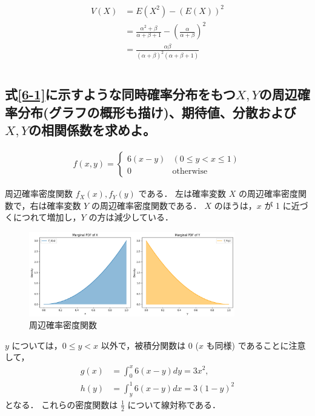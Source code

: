 \documentclass[titlepage,a4paper]{jsarticle}
\begin{document}
\begin{align}
  V(X) & = E(X^2) - (E(X))^2                                                                            \\
       & = \frac{\alpha^2 + \beta}{\alpha + \beta + 1} - \left( \frac{\alpha}{\alpha + \beta} \right)^2 \\
       & = \frac{\alpha \beta}{(\alpha + \beta)^2 (\alpha + \beta + 1)}
\end{align}

\section{ }%
\subsection{式\ref{6-1}に示すような同時確率分布をもつ$X,Y$の周辺確率分布(グラフの概形も描け)、期待値、分散および$X,Y$の相関係数を求めよ。}
\begin{align}
  f(x, y) =
  \begin{cases}
    6(x - y) & (0 \leq y < x \leq 1) \\
    0        & \text{otherwise}
  \end{cases}
  \label{6-1}
\end{align}

周辺確率密度関数 \( f_X(x), f_Y(y) \) である．
左は確率変数 \( X \) の周辺確率密度関数で，右は確率変数 \( Y \) の周辺確率密度関数である．
\( X \) のほうは，\( x \) が 1 に近づくにつれて増加し，\( Y \) の方は減少している．
\begin{figure}[H]
  \centering
  \includegraphics[width=0.8\textwidth]{img/XY.png}
  \caption{周辺確率密度関数}
  \label{fig:6_1}
\end{figure}
\( y \) については，\( 0 \leq y < x \) 以外で，被積分関数は 0 (\( x \) も同様) であることに注意して，
\begin{align*}
  g(x) & = \int_0^x 6(x - y)dy = 3x^2,      \\
  h(y) & = \int_y^1 6(x - y)dx = 3(1 - y)^2
\end{align*}
となる．
これらの密度関数は \( \frac{1}{2} \) について線対称である．
\end{document}
